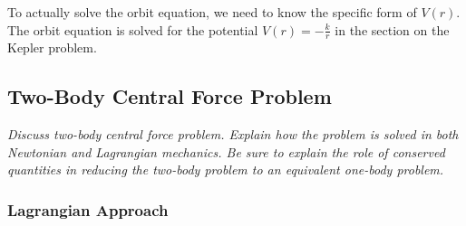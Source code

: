 \documentclass[11pt, a4paper]{article}
\begin{document}
\begin{itemize}
	To actually solve the orbit equation, we need to know the specific form of $ V(r) $. The orbit equation is solved for the potential $ V(r) = -\frac{k}{r} $ in the section on the Kepler problem.

\end{itemize}


\subsection{Two-Body Central Force Problem}
\textit{Discuss two-body central force problem. Explain how the problem is solved in both Newtonian and Lagrangian mechanics. Be sure to explain the role of conserved quantities in reducing the two-body problem to an equivalent one-body problem.}


\subsubsection{Lagrangian Approach}
\end{document}
